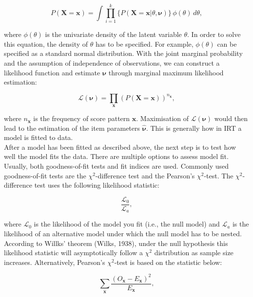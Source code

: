 \documentclass[Royal,sageapa,times,doublespace]{Manuscript-Files/sagej}
\begin{document}
\begin{equation}
P(\boldsymbol{X} = \boldsymbol{x}) = \int \prod_{i=1}^{k} \{ P(\boldsymbol{X} = \boldsymbol{x} | \theta, \boldsymbol{\nu}) \} \,\phi(\theta)\,d\theta,
\end{equation}

where $\phi(\theta)$ is the univariate density of the latent variable $\theta$. In order to solve this equation, the density of $\theta$ has to be specified. For example, $\phi(\theta)$ can be specified as a standard normal distribution. With the joint marginal probability and the assumption of independence of observations, we can construct a likelihood function and estimate $\boldsymbol{\nu}$ through marginal maximum likelihood estimation:

\begin{equation}
\mathcal{L}(\boldsymbol{\nu}) = \prod_{\boldsymbol{x}} (P(\boldsymbol{X} = \boldsymbol{x}))^{n_{\boldsymbol{x}}},
\end{equation}

where $n_{\boldsymbol{x}}$ is the frequency of score pattern $\boldsymbol{x}$. Maximisation of $\mathcal{L}(\boldsymbol{\nu})$ would then lead to the estimation of the item parameters $\boldsymbol{\hat{\nu}}$. This is generally how in IRT a model is fitted to data. \\
\indent After a model has been fitted as described above, the next step is to test how well the model fits the data. There are multiple options to assess model fit. Usually, both goodness-of-fit tests and fit indices are used. Commonly used goodness-of-fit tests are the $\chi^2$-difference test and the Pearson's $\chi^2$-test. The $\chi^2$-difference test uses the following likelihood statistic:

\begin{equation}
\frac{\mathcal{L}_0}{\mathcal{L}_a},
\end{equation}

where $\mathcal{L}_0$ is the likelihood of the model you fit (i.e., the null model) and $\mathcal{L}_a$ is the likelihood of an alternative model under which the null model has to be nested. According to Willks' theorem (Wilks, 1938), under the null hypothesis this likelihood statistic will asymptotically follow a $\chi^2$ distribution as sample size increases. Alternatively, Pearson's $\chi^2$-test is based on the statistic below: 

\begin{equation}
\sum_{\boldsymbol{x}} \frac{(O_{\boldsymbol{x}} - E_{\boldsymbol{x}})^2}{E_{\boldsymbol{x}}},
\end{equation}
\end{document}
